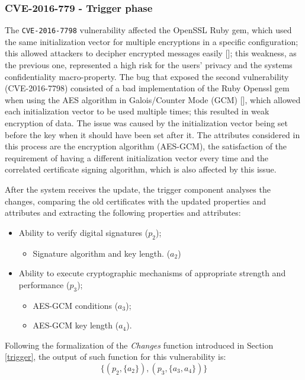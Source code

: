 \subsubsection{CVE-2016-779 - Trigger phase}
The \texttt{CVE-2016-7798} vulnerability affected the OpenSSL Ruby gem, which used the same initialization vector for multiple encryptions in a specific configuration; this allowed attackers to decipher encrypted messages easily []; this weakness, as the previous one, represented a high risk for the users' privacy and the systems confidentiality macro-property.
The bug that exposed the second vulnerability (CVE-2016-7798) consisted of a bad implementation of the Ruby Openssl gem when using the AES algorithm in Galois/Counter Mode (GCM) [], which allowed each initialization vector to be used multiple times; this resulted in weak encryption of data. The issue was caused by the initialization vector being set before the key when it should have been set after it. The attributes considered in this process are the encryption algorithm (AES-GCM), the satisfaction of the requirement of having a different initialization vector every time and the correlated certificate signing algorithm, which is also affected by this issue.



After the system receives the update, the trigger component analyses the changes, comparing the old certificates with the updated properties and attributes and extracting the following properties and attributes:

\begin{itemize}
    \item Ability to verify digital signatures (\(p_2\));
    \begin{itemize}
        \item Signature algorithm and key length. (\(a_2\))
    \end{itemize}
    \item Ability to execute cryptographic mechanisms of appropriate strength and performance (\(p_3\));
    \begin{itemize}
        \item AES-GCM conditions (\(a_3\));
        \item AES-GCM key length (\(a_4\)).
    \end{itemize}
\end{itemize}

Following the formalization of the \textit{Changes} function introduced in Section \ref{trigger}, the output of such function for this vulnerability is: \[ \{(p_2, \{a_2\}), (p_3, \{a_3, a_4\}) \}\]

